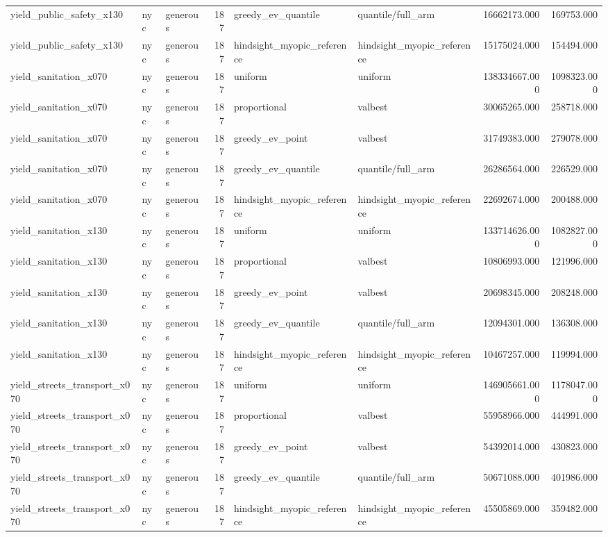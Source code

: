 \begin{tabular}{lllrllrr}
yield\_public\_safety\_x130 & nyc & generous & 187 & greedy\_ev\_quantile & quantile/full\_arm & 16662173.000 & 169753.000 \\
yield\_public\_safety\_x130 & nyc & generous & 187 & hindsight\_myopic\_reference & hindsight\_myopic\_reference & 15175024.000 & 154494.000 \\
yield\_sanitation\_x070 & nyc & generous & 187 & uniform & uniform & 138334667.000 & 1098323.000 \\
yield\_sanitation\_x070 & nyc & generous & 187 & proportional & valbest & 30065265.000 & 258718.000 \\
yield\_sanitation\_x070 & nyc & generous & 187 & greedy\_ev\_point & valbest & 31749383.000 & 279078.000 \\
yield\_sanitation\_x070 & nyc & generous & 187 & greedy\_ev\_quantile & quantile/full\_arm & 26286564.000 & 226529.000 \\
yield\_sanitation\_x070 & nyc & generous & 187 & hindsight\_myopic\_reference & hindsight\_myopic\_reference & 22692674.000 & 200488.000 \\
yield\_sanitation\_x130 & nyc & generous & 187 & uniform & uniform & 133714626.000 & 1082827.000 \\
yield\_sanitation\_x130 & nyc & generous & 187 & proportional & valbest & 10806993.000 & 121996.000 \\
yield\_sanitation\_x130 & nyc & generous & 187 & greedy\_ev\_point & valbest & 20698345.000 & 208248.000 \\
yield\_sanitation\_x130 & nyc & generous & 187 & greedy\_ev\_quantile & quantile/full\_arm & 12094301.000 & 136308.000 \\
yield\_sanitation\_x130 & nyc & generous & 187 & hindsight\_myopic\_reference & hindsight\_myopic\_reference & 10467257.000 & 119994.000 \\
yield\_streets\_transport\_x070 & nyc & generous & 187 & uniform & uniform & 146905661.000 & 1178047.000 \\
yield\_streets\_transport\_x070 & nyc & generous & 187 & proportional & valbest & 55958966.000 & 444991.000 \\
yield\_streets\_transport\_x070 & nyc & generous & 187 & greedy\_ev\_point & valbest & 54392014.000 & 430823.000 \\
yield\_streets\_transport\_x070 & nyc & generous & 187 & greedy\_ev\_quantile & quantile/full\_arm & 50671088.000 & 401986.000 \\
yield\_streets\_transport\_x070 & nyc & generous & 187 & hindsight\_myopic\_reference & hindsight\_myopic\_reference & 45505869.000 & 359482.000 \\

\end{tabular}

